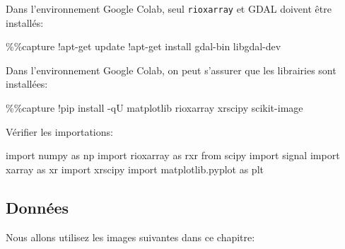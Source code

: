 \documentclass[
  11pt,
  letterpaper,
  open=any,
  twoside=false,
  french]{scrbook}
\newenvironment{Shaded}{\begin{snugshade}}{\end{snugshade}}
\newcommand{\BuiltInTok}[1]{\textcolor[rgb]{0.00,0.23,0.31}{#1}}
\newcommand{\ImportTok}[1]{\textcolor[rgb]{0.00,0.46,0.62}{#1}}
\newcommand{\NormalTok}[1]{\textcolor[rgb]{0.00,0.23,0.31}{#1}}
\newcommand{\OperatorTok}[1]{\textcolor[rgb]{0.37,0.37,0.37}{#1}}
\begin{document}
Dans l'environnement Google Colab, seul \texttt{rioxarray} et GDAL
doivent être installés:

\begin{Shaded}
\begin{Highlighting}[]
\OperatorTok{\%\%}\NormalTok{capture}
\OperatorTok{!}\NormalTok{apt}\OperatorTok{{-}}\NormalTok{get update}
\OperatorTok{!}\NormalTok{apt}\OperatorTok{{-}}\NormalTok{get install gdal}\OperatorTok{{-}}\BuiltInTok{bin}\NormalTok{ libgdal}\OperatorTok{{-}}\NormalTok{dev}
\end{Highlighting}
\end{Shaded}

Dans l'environnement Google Colab, on peut s'assurer que les librairies
sont installées:

\begin{Shaded}
\begin{Highlighting}[]
\OperatorTok{\%\%}\NormalTok{capture}
\OperatorTok{!}\NormalTok{pip install }\OperatorTok{{-}}\NormalTok{qU matplotlib rioxarray xrscipy scikit}\OperatorTok{{-}}\NormalTok{image}
\end{Highlighting}
\end{Shaded}

Vérifier les importations:

\begin{Shaded}
\begin{Highlighting}[]
\ImportTok{import}\NormalTok{ numpy }\ImportTok{as}\NormalTok{ np}
\ImportTok{import}\NormalTok{ rioxarray }\ImportTok{as}\NormalTok{ rxr}
\ImportTok{from}\NormalTok{ scipy }\ImportTok{import}\NormalTok{ signal}
\ImportTok{import}\NormalTok{ xarray }\ImportTok{as}\NormalTok{ xr}
\ImportTok{import}\NormalTok{ xrscipy}
\ImportTok{import}\NormalTok{ matplotlib.pyplot }\ImportTok{as}\NormalTok{ plt}
\end{Highlighting}
\end{Shaded}

\subsection{Données}\label{donnuxe9es-1}

Nous allons utilisez les images suivantes dans ce chapitre:
\end{document}
